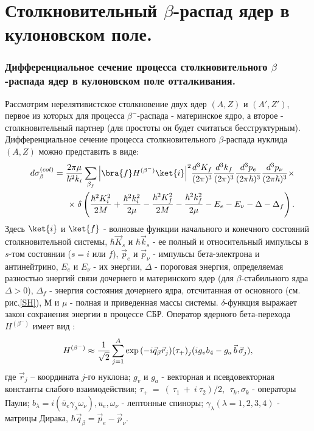 \chapter{Столкновительный $\beta$-распад ядер в кулоновском поле.}

\subsection{Дифференциальное сечение  процесса столкновительного
$\beta$-распада ядер в кулоновском поле отталкивания.}

Рассмотрим нерелятивистское столкновение двух ядер $(A,Z)$ и $(A',Z')$,
первое из которых для процесса $\beta^-$-распада - материнское ядро, а второе
- столкновительный партнер (для простоты он будет считаться
бесструктурным).
Дифференциальное сечение процесса столкновительного $\beta$-распада
нуклида $(A,Z)$ можно  представить в виде:
\begin{eqnarray}\label{ds}
&&d\sigma^{(col)}_\beta={2\pi\mu\over{\hbar^2k_i}}\sum_{\beta_f}{\left| \bra{f} H^{(\beta^-)}
\ket{i}\right|}^2{d^3 K_f\over{(2\pi)^3}}{d^3 k_f\over{(2\pi)^3}}
{d^3 p_e\over{(2\pi\hbar)^3}}{d^3 p_\nu\over{(2\pi\hbar)^3}}\times\nonumber\\
&&\times\;\delta\left({\hbar^2 K_i^2\over{2 M}}+{\hbar^2 k_i^2\over{2\mu}}-{\hbar^2 K_f^2\over{2 M}}-
{\hbar^2 k_f^2\over{2\mu}}-E_e-E_\nu-\Delta-\Delta_f\right).
\end{eqnarray}
Здесь $\ket{i}$ и $\ket{f}$ - волновые функции начального и конечного состояний
столкновительной системы,
$\hbar \vec K_s$ и $\hbar \vec k_s$ - ее полный и относительный импульсы
в $s$-том состоянии ($s=i$ или $f$),
$\vec p_e$ и $\vec p_\nu$ - импульсы бета-электрона и антинейтрино,
$E_e$ и $E_\nu$ - их энергии,
$\Delta$ - пороговая энергия, определяемая разностью энергий связи
дочернего и материнского ядер (для $\beta$-стабильного ядра $\Delta>0$),
$\Delta_f$  - энергия состояния дочернего ядра, отсчитанная от
основного (см. рис.\ref{SH}),
$М$ и $\mu$ - полная и приведенная массы системы.
$\delta$-функция выражает закон сохранения энергии в процессе СБР.
Оператор ядерного бета-перехода  $H^{(\beta^-)}$ имеет вид \cite{aiz}:
\begin{eqnarray}\label{nH^beta}
H^{(\beta^-)}\approx {{1}\over{\sqrt{2}}}\sum_{j=1}^{A} \exp{( -i \vec q_\beta \vec r_j)}
(\tau_+)_j ( i g_v b_4 - g_a\, \vec b\, \vec \sigma_j ),
\end{eqnarray}
где $\vec r_j$ -- координата $j$-го нуклона;
$g_v$ и $g_a$ - векторная и псевдовекторная константы слабого
взаимодействия;
$\tau_+~=~(~\tau_1~+~i~\tau_2)/2$, $\;\tau_k,\sigma_k$ - операторы Паули;
$b_\lambda=i ( \bar u_e \gamma_\lambda \omega_\nu), u_e, \omega_\nu$ - лептонные
спиноры; $\gamma_\lambda (\lambda = 1,2,3,4 )$ - матрицы Дирака,
$\hbar \vec q_\beta=\vec p_e-\vec p_\nu$.

